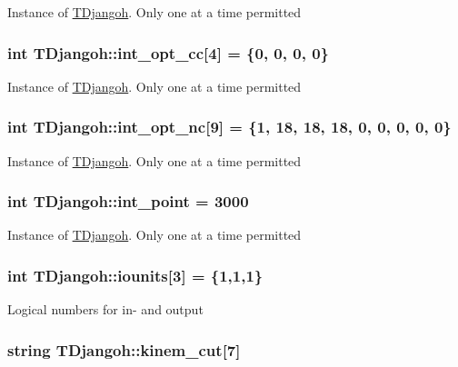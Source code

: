 Instance of \hyperlink{class_t_djangoh}{T\+Djangoh}. Only one at a time permitted \hypertarget{class_t_djangoh_ac6e61b78890fac424ba060d8411fc266}{
\subsubsection[{int\+\_\+opt\+\_\+cc}]{\setlength{\rightskip}{0pt plus 5cm}int T\+Djangoh\+::int\+\_\+opt\+\_\+cc\mbox{[}4\mbox{]} = \{0, 0, 0, 0\}}}\label{class_t_djangoh_ac6e61b78890fac424ba060d8411fc266}
Instance of \hyperlink{class_t_djangoh}{T\+Djangoh}. Only one at a time permitted \hypertarget{class_t_djangoh_acd610fcad702bfa2bc5128426aab1300}{
\subsubsection[{int\+\_\+opt\+\_\+nc}]{\setlength{\rightskip}{0pt plus 5cm}int T\+Djangoh\+::int\+\_\+opt\+\_\+nc\mbox{[}9\mbox{]} = \{1, 18, 18, 18, 0, 0, 0, 0, 0\}}}\label{class_t_djangoh_acd610fcad702bfa2bc5128426aab1300}
Instance of \hyperlink{class_t_djangoh}{T\+Djangoh}. Only one at a time permitted \hypertarget{class_t_djangoh_a4faef5bd11a1646664432b735c3998e8}{
\subsubsection[{int\+\_\+point}]{\setlength{\rightskip}{0pt plus 5cm}int T\+Djangoh\+::int\+\_\+point = 3000}}\label{class_t_djangoh_a4faef5bd11a1646664432b735c3998e8}
Instance of \hyperlink{class_t_djangoh}{T\+Djangoh}. Only one at a time permitted \hypertarget{class_t_djangoh_a6cc9b21270635d3dcee6de0c7e826726}{
\subsubsection[{iounits}]{\setlength{\rightskip}{0pt plus 5cm}int T\+Djangoh\+::iounits\mbox{[}3\mbox{]} = \{1,1,1\}}}\label{class_t_djangoh_a6cc9b21270635d3dcee6de0c7e826726}
Logical numbers for in-\/ and output \hypertarget{class_t_djangoh_a97b4c77f2767a449920e0126ab7314b3}{
\subsubsection[{kinem\+\_\+cut}]{\setlength{\rightskip}{0pt plus 5cm}string T\+Djangoh\+::kinem\+\_\+cut\mbox{[}7\mbox{]}}}\label{class_t_djangoh_a97b4c77f2767a449920e0126ab7314b3}
